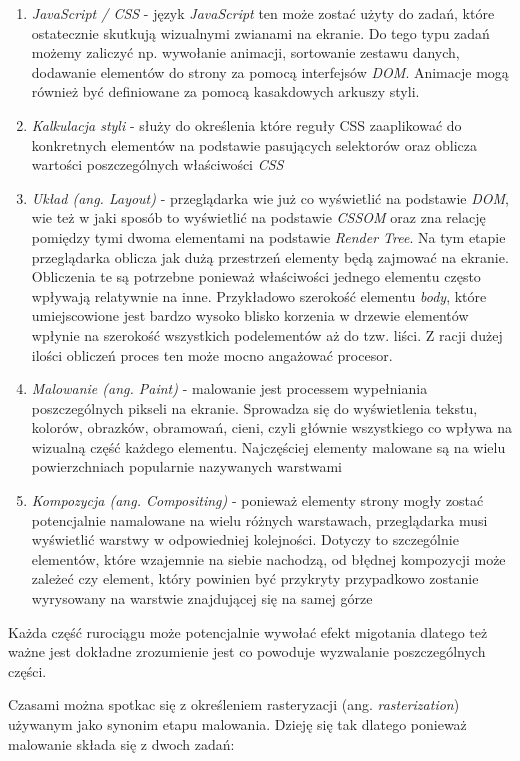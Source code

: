 \documentclass[polish, twoside, 12pt]{mwart}
\begin{document}
\begin{enumerate}
  \item \emph{JavaScript / CSS} - język \emph{JavaScript} ten może zostać użyty do zadań, które ostatecznie skutkują wizualnymi zwianami na ekranie. Do tego typu zadań możemy zaliczyć np. wywołanie animacji, sortowanie zestawu danych, dodawanie elementów do strony za pomocą interfejsów \emph{DOM}. Animacje mogą również być definiowane za pomocą kasakdowych arkuszy styli.
  \item \emph{Kalkulacja styli} - służy do określenia które reguły CSS zaaplikować do konkretnych elementów na podstawie pasujących selektorów oraz oblicza wartości poszczególnych właściwości \emph{CSS}
  \item \emph{Układ (ang. Layout)} - przeglądarka wie już co wyświetlić na podstawie \emph{DOM}, wie też w jaki sposób to wyświetlić na podstawie \emph{CSSOM} oraz zna relację pomiędzy tymi dwoma elementami na podstawie \emph{Render Tree}. Na tym etapie przeglądarka oblicza jak dużą przestrzeń elementy będą zajmować na ekranie. Obliczenia te są potrzebne ponieważ właściwości jednego elementu często wpływają relatywnie na inne. Przykładowo szerokość elementu \emph{body}, które umiejscowione jest bardzo wysoko blisko korzenia w drzewie elementów wpłynie na szerokość wszystkich podelementów aż do tzw. liści. Z racji dużej ilości obliczeń proces ten może mocno angażować procesor.
  \item \emph{Malowanie (ang. Paint)} - malowanie jest processem wypełniania poszczególnych pikseli na ekranie. Sprowadza się do wyświetlenia tekstu, kolorów, obrazków, obramowań, cieni, czyli głównie wszystkiego co wpływa na wizualną część każdego elementu. Najczęściej elementy malowane są na wielu powierzchniach popularnie nazywanych warstwami
  \item \emph{Kompozycja (ang. Compositing)} - ponieważ elementy strony mogły zostać potencjalnie namalowane na wielu różnych warstawach, przeglądarka musi wyświetlić warstwy w odpowiedniej kolejności. Dotyczy to szczególnie elementów, które wzajemnie na siebie nachodzą, od błędnej kompozycji może zależeć czy element, który powinien być przykryty przypadkowo zostanie wyrysowany na warstwie znajdującej się na samej górze
\end{enumerate}

Każda część rurociągu może potencjalnie wywołać efekt migotania dlatego też ważne jest dokładne zrozumienie jest co powoduje wyzwalanie poszczególnych części.

Czasami można spotkac się z określeniem rasteryzacji (ang. \emph{rasterization}) używanym jako synonim etapu malowania. Dzieję się tak dlatego ponieważ malowanie składa się z dwoch zadań:
\end{document}
